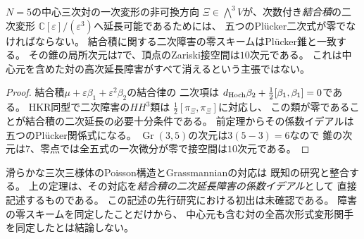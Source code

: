 \begin{corollary}[二次まで延長できる非可換一次方向]
\label{fpk:cor:second-order}
$N=5$の中心三次対の一次変形の非可換方向
$\Xi\in\bigwedge^3V$が、次数付き\emph{結合積}の二次変形
$\mathbb C[\varepsilon]/(\varepsilon^3)$へ延長可能であるためには、
五つのPl\"ucker二次式が零でなければならない。
結合積に関する二次障害の零スキームはPl\"ucker錐と一致する。
その錐の局所次元は$7$で、頂点のZariski接空間は$10$次元である。
これは中心元を含めた対の高次延長障害がすべて消えるという主張ではない。
\end{corollary}
\begin{proof}
結合積$\mu+\varepsilon\beta_1+\varepsilon^2\beta_2$の結合律の
二次項は
$d_{\rm Hoch}\beta_2+\frac12[\beta_1,\beta_1]=0$である。
HKR同型で二次障害の$HH^3$類は
$\frac12[\pi_\Xi,\pi_\Xi]$に対応し、
この類が零であることが結合積の二次延長の必要十分条件である。
前定理からその係数イデアルは五つのPl\"ucker関係式になる。
$\operatorname{Gr}(3,5)$の次元は$3(5-3)=6$なので
錐の次元は$7$、零点では全五式の一次微分が零で接空間は$10$次元である。
\end{proof}

\begin{remark}[Pl\"ucker障害の射程]
\label{fpk:rem:plucker-scope}
滑らかな三次三様体のPoisson構造とGrassmannianの対応は
既知の研究\cite{PMayanskiy}と整合する。
上の定理は、その対応を\emph{結合積の二次延長障害の係数イデアル}として
直接記述するものである。
この記述の先行研究における初出は未確認である。
障害の零スキームを同定したことだけから、
中心元も含む対の全高次形式変形関手を同定したとは結論しない。
\end{remark}


